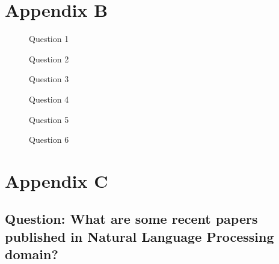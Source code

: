 \documentclass[fleqn,moreauthors,10pt]{ds_report}
\begin{document}
\clearpage

\section*{Appendix B}

\begin{figure}[H]
    \centering
    
    \caption{Question 1}
    \label{fig:question_1}
\end{figure}

\begin{figure}[H]
    \centering
    
    \caption{Question 2}
    \label{fig:question_2}
\end{figure}

\begin{figure}[H]
    \centering
    
    \caption{Question 3}
    \label{fig:question_3}
\end{figure}

\begin{figure}[H]
    \centering
    
    \caption{Question 4}
    \label{fig:question_4}
\end{figure}

\begin{figure}[H]
    \centering
    
    \caption{Question 5}
    \label{fig:question_5}
\end{figure}

\begin{figure}[H]
    \centering
    
    \caption{Question 6}
    \label{fig:question_6}
\end{figure}

\section*{Appendix C}

\subsection*{Question: What are some recent papers published in Natural Language Processing domain?}
\end{document}
